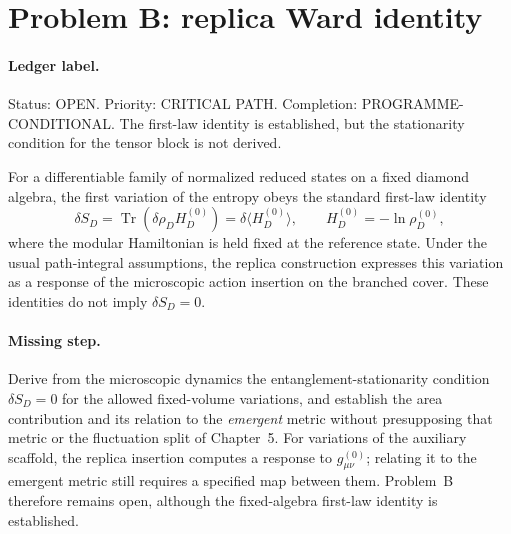 \section{Problem B: replica Ward identity}
\label{sec:status-B}

\paragraph{Ledger label.}
Status: OPEN. Priority: CRITICAL PATH. Completion:
PROGRAMME-CONDITIONAL. The first-law identity is established, but
the stationarity condition for the tensor block is not derived.

For a differentiable family of normalized reduced states on a fixed
diamond algebra, the first variation of the entropy obeys the standard
first-law identity
\[
\delta S_D
=
\operatorname{Tr}(\delta\rho_D H_D^{(0)})
=
\delta\langle H_D^{(0)}\rangle,
\qquad
H_D^{(0)}=-\ln\rho_D^{(0)},
\]
where the modular Hamiltonian is held fixed at the reference state.
Under the usual path-integral assumptions, the replica construction
expresses this variation as a response of the microscopic action
insertion on the branched cover. These identities do not imply
\(\delta S_D=0\).

\paragraph{Missing step.}
Derive from the microscopic dynamics the entanglement-stationarity
condition \(\delta S_D=0\) for the allowed fixed-volume variations,
and establish the area contribution and its relation to the
\emph{emergent} metric without presupposing that metric or the
fluctuation split of Chapter~5. For variations of the auxiliary
scaffold, the replica insertion computes a response to
\(g^{(0)}_{\mu\nu}\); relating it to the emergent metric still
requires a specified map between them. Problem~B therefore remains
open, although the fixed-algebra first-law identity is established.

